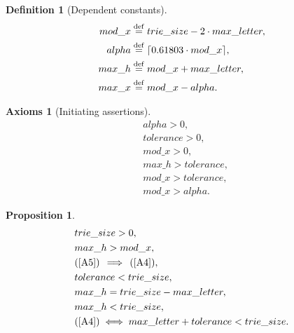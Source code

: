 \documentclass[a4paper,9pt,leqno]{article}
\renewcommand{\=}{\protect\nobreakdash-\hspace{0pt}}
\renewcommand{\~}{\protect\nobreakdash--\hspace{0pt}}
\theoremstyle{plain}
\newtheorem{axioms}[fact]{Axioms}
\newtheorem{prop}[fact]{Proposition}
\theoremstyle{definition}
\newtheorem{defn}[fact]{Definition}
\theoremstyle{remark}
\newcommand{\ceil}[1]{\lceil#1\rceil}
\newcommand{\impll}{\:\:\Longrightarrow\:\:}
\newcommand{\impl}{\impll}%
\newcommand{\parref}[1]{(\ref{#1})}
\newcommand{\by}[1]{{#1}}
\newcommand{\bydef}{\by{def}}
\newcommand{\symby}[2]{\stackrel{#1}{{#2}}}
\newcommand{\symbyrm}[2]{\symby{{\rm\scriptstyle{#1}}}{#2}}
\newcommand{\eqby}[1]{\symbyrm{#1}{=}}
\newcommand{\eqbydef}{\eqby{\bydef}}
\newcommand{\gt}{>}
\newcommand{\lt}{<}
\begin{document}
\begin{defn}[Dependent constants]
\begin{align}
mod\_x & \eqbydef trie\_size - 2 \cdot max\_letter, \label{mod-x}\\
%
alpha & \eqbydef \ceil{0.61803 \cdot mod\_x},       \label{alpha}\\
%
max\_h & \eqbydef mod\_x + max\_letter,             \label{max-h}\\
%
max\_x & \eqbydef mod\_x - alpha.                   \label{max-x}
\end{align}
\end{defn}

\begin{axioms}[Initiating assertions]
\begin{align}
& alpha > 0,          \label{A1}\\
%
& tolerance > 0,      \label{A2}\\
%
& mod\_x > 0,         \label{A3}\\
%
& max\_h > tolerance, \label{A4}\\
%
& mod\_x > tolerance, \label{A5}\\
%
& mod\_x > alpha.     \label{A6}
\end{align}
\end{axioms}

\begin{prop}
\begin{align}
& trie\_size \gt 0,                                        \label{trie-size-gt-0}\\
%
& max\_h \gt mod\_x,                                       \label{max-h-gt-mod-x}\\
%
& \parref{A5} \impl \parref{A4},                           \label{a5-impl-a4}\\
%
& tolerance \lt trie\_size,                                \label{tol-lt-trie-size}\\
%
& max\_h = trie\_size - max\_letter,                       \label{max-h-2}\\
%
& max\_h \lt trie\_size,                                   \label{max-h-lt-trie-size}\\
%
& \parref{A4} \iff max\_letter + tolerance \lt trie\_size. \label{a4-tol-max-letter}
\end{align}
\end{prop}
\end{document}
